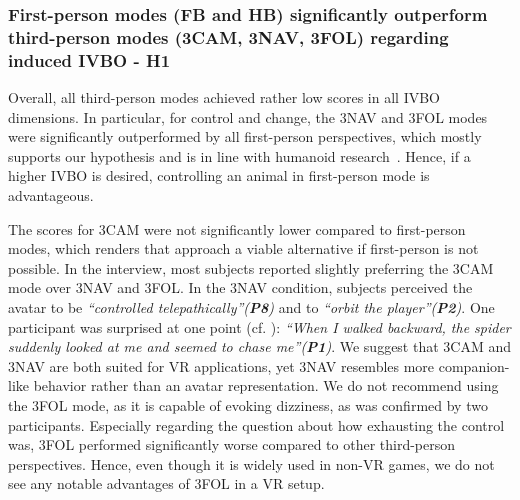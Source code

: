 \documentclass[conference]{IEEEtran}
\begin{document}
\subsubsection{First-person modes (FB and HB) significantly outperform third-person modes (3CAM, 3NAV, 3FOL) regarding induced IVBO - \textbf{H1}} Overall, all third-person modes achieved rather low scores in all IVBO dimensions. In particular, for control and change, the 3NAV and 3FOL modes were significantly outperformed by all first-person perspectives, which mostly supports our hypothesis and is in line with humanoid research~\cite{galvan2015characterizing, maselli2013building}. Hence, if a higher IVBO is desired, controlling an animal in first-person mode is advantageous.

The scores for 3CAM were not significantly lower compared to first-person modes, which renders that approach a viable alternative if first-person is not possible. In the interview, most subjects reported slightly preferring the 3CAM mode over 3NAV and 3FOL. In the 3NAV condition, subjects perceived the avatar to be \textit{``controlled telepathically''(\textbf{P8})} and to \textit{``orbit the player''(\textbf{P2})}. One participant was surprised at one point (cf. ): \textit{``When I walked backward, the spider suddenly looked at me and seemed to chase me''(\textbf{P1})}. We suggest that 3CAM and 3NAV are both suited for VR applications, yet 3NAV resembles more companion-like behavior rather than an avatar representation. We do not recommend using the 3FOL mode, as it is capable of evoking dizziness, as was confirmed by two participants. Especially regarding the question about how exhausting the control was, 3FOL performed significantly worse compared to other third-person perspectives. Hence, even though it is widely used in non-VR games, we do not see any notable advantages of 3FOL in a VR setup.
\end{document}
